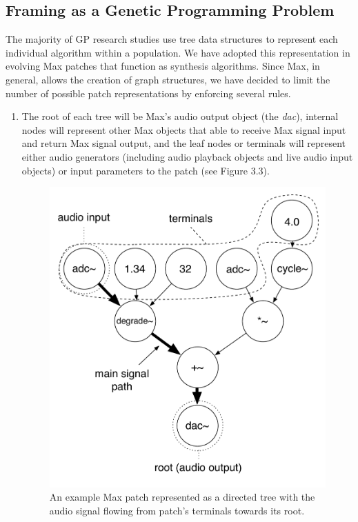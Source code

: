 \documentclass[a4paper,12pt]{report} 	%
\numberwithin{figure}{chapter}
\numberwithin{table}{chapter}
\numberwithin{equation}{chapter}
\begin{document}
\begin{flushleft}
\subsection{Framing as a Genetic Programming Problem}
The majority of GP research studies use tree data structures to represent each individual algorithm within a population. We have adopted this representation in evolving Max patches that function as synthesis algorithms. Since Max, in general, allows the creation of graph structures, we have decided to limit the number of possible patch representations by enforcing several rules. 
\begin{enumerate}
\item The root of each tree will be Max's audio output object (the \emph{dac\texttildelow{}}), internal nodes will represent other Max objects that able to receive Max signal input and return Max signal output, and the leaf nodes or terminals will represent either audio generators (including audio playback objects and live audio input objects) or input parameters to the patch (see Figure 3.3).
\begin{figure}[h!]
\begin{center}
\includegraphics[scale=0.7]{RootTree}
\caption[A Max Patch as a Directed Tree]{An example Max patch represented as a directed tree with the audio signal flowing from patch's terminals towards its root.}

\end{center}
\end{figure}
\end{enumerate}
\end{flushleft}
\end{document}
